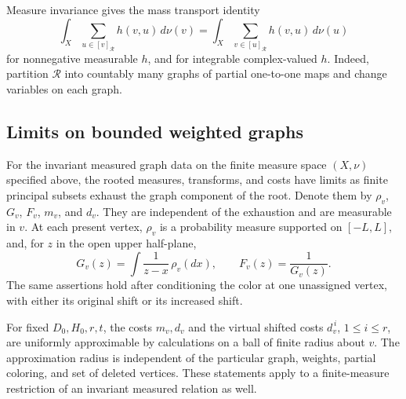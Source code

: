 Measure invariance gives the mass transport identity
\begin{equation}\label{inv:mass-transport}
 \int_X\sum_{u\in[v]_{\mathcal R}} h(v,u)\,d\nu(v)
 =\int_X\sum_{v\in[u]_{\mathcal R}} h(v,u)\,d\nu(u)
\end{equation}
for nonnegative measurable $h$, and for integrable complex-valued $h$.
Indeed, partition $\mathcal R$ into countably many graphs of partial
one-to-one maps and change variables on each graph.

\subsection{Limits on bounded weighted graphs}

\begin{lemma}\label{lem:bounded-costs}
For the invariant measured graph data on the finite measure space
$(X,\nu)$ specified above, the rooted measures,
transforms, and costs have limits as finite principal subsets exhaust the
graph component of the root.  Denote them by
$\rho_v$, $G_v$, $F_v$, $m_v$, and $d_v$.  They are independent of the
exhaustion and are measurable in $v$.  At each present vertex, $\rho_v$ is a probability
measure supported on $[-L,L]$, and, for $z$ in the open upper half-plane,
\[
 G_v(z)=\int\frac{1}{z-x}\,\rho_v(dx),\qquad F_v(z)=\frac1{G_v(z)}.
\]
The same assertions hold after conditioning the color at one unassigned
vertex, with either its original shift or its increased shift.

For fixed $D_0,H_0,r,t$, the costs $m_v,d_v$ and the virtual shifted costs
$d_v^{\,i}$, $1\leq i\leq r$, are uniformly approximable by calculations on
a ball of finite radius about $v$.  The approximation radius is independent
of the particular graph, weights, partial coloring, and set of deleted
vertices.  These statements apply to a finite-measure restriction of an
invariant measured relation as well.
\end{lemma}

